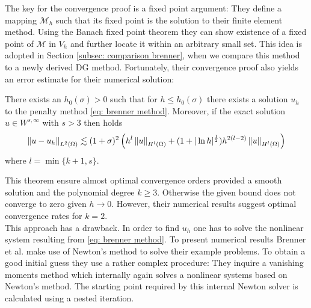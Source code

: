 The key for the convergence proof is a fixed point argument: %
They define a mapping $\mathcal M_h$ such that its fixed point is the solution to their finite element method. 
Using the Banach fixed point theorem they can show existence of a fixed point of $\mathcal M$ in $V_h$ and further locate it within an arbitrary small set. This idea is adopted in Section \ref{subsec: comparison brenner}, when we compare this method to a newly derived DG method. Fortunately, their convergence proof also yields an error estimate for their numerical solution:
\begin{theorem}\label{thm: error estimate brenner}
	There exists an $h_0(\sigma) > 0$ such that for $h \leq h_0(\sigma)$ there exists a solution $u_h$ to the penalty method \eqref{eq: brenner method}. Moreover, if the exact solution $u \in W^{s,\infty}$ with $s>3$ then holds
	\begin{align*}
		\left\lVert u-u_h \right\rVert_{L^2(\Omega)} \lesssim (1+\sigma)^2 
		                        \left(h^{l} \left\lVert u \right\rVert_{H^l(\Omega)} + (1+ | \ln h |^{\frac 1 2 }) h^{2(l-2)} \left\lVert u \right\rVert_{H^l(\Omega)} \right)
	\end{align*}
where $l=\min\{k+1,s\}$. 
\end{theorem}
This theorem ensure almost optimal convergence orders provided a smooth solution and the polynomial degree $k\geq 3$. Otherwise the given bound does not converge to zero given $h \rightarrow 0$. However, their numerical results suggest optimal convergence rates for $k=2$.\\
This approach has a drawback. In order to find $u_h$ one has to solve the nonlinear system resulting from \eqref{eq: brenner method}. To present numerical results Brenner et al. make use of Newton's method to solve their example problems. 
To obtain a good initial guess they use a rather complex procedure: They inquire a vanishing moments method which internally again solves a nonlinear systems based on Newton's method. The starting point required by this internal Newton solver is calculated using a nested iteration.

